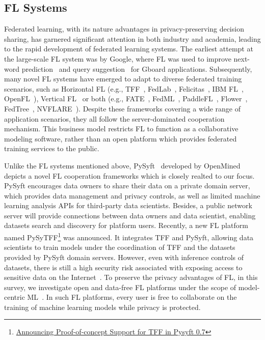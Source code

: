 \documentclass[journal]{IEEEtran}
\begin{document}
\subsection{FL Systems}
\label{sec:flsystems}
Federated learning, with its nature advantages in privacy-preserving decision sharing, has garnered significant attention in both industry and academia, leading to the rapid development of federated learning systems.
The earliest attempt at the large-scale FL system was by Google, where FL was used to improve next-word prediction~\cite{hard2018federated} and query suggestion~\cite{yang2018applied} for Gboard applications.
Subsequently, many novel FL systems have emerged to adapt to diverse federated training scenarios, such as Horizontal FL (e.g., TFF~\cite{abadi2016tensorflow}, FedLab~\cite{zeng2023fedlab}, Felicitas~\cite{zhang2022felicitas}, IBM FL~\cite{ibmfl2020ibm}, OpenFL~\cite{foley2022openfl}), Vertical FL~\cite{wu2022practical} or both (e.g., FATE~\cite{liu2021fate}, FedML~\cite{he2020fedml}, PaddleFL~\cite{ma2019paddlepaddle}, Flower~\cite{beutel2020flower}, FedTree~\cite{li2023fedtree}, NVFLARE~\cite{roth2022nvidia}).
Despite these frameworks covering a wide range of application scenarios, they all follow the server-dominated cooperation mechanism.
This business model restricts FL to function as a collaborative modeling software, rather than an open platform which provides federated training services to the public.

Unlike the FL systems mentioned above, PySyft~\cite{ziller2021pysyft} developed by OpenMined depicts a novel FL cooperation frameworks which is closely realted to our focus. 
PySyft encourages data owners to share their data on a private domain server, which provides data management and privacy controls, as well as limited machine learning analysis APIs for third-party data scientists.
Besides, a public network server will provide connections between data owners and data scientist, enabling datasets search and discovery for platform users.
Recently, a new FL platform named PySyTFF\footnote{\href{https://blog.openmined.org/announcing-proof-of-concept-support-for-tff-in-pysyft-0-7/}{Announcing Proof-of-concept Support for TFF in Pysyft 0.7}} was announced. It integrates TFF and PySyft, allowing data scientists to train models under the coordination of TFF and the datasets provided by PySyft domain servers.
However, even with inference controls of datasets, there is still a high security risk associated with exposing access to sensitive data on the Internet~\cite{gamundani2018review}.
To preserve the privacy advantages of FL, in this survey, we investigate open and data-free FL platforms under the scope of model-centric ML~\cite{lou2020towards}.
In such FL platforms, every user is free to collaborate on the training of machine learning models while privacy is protected.
\end{document}
